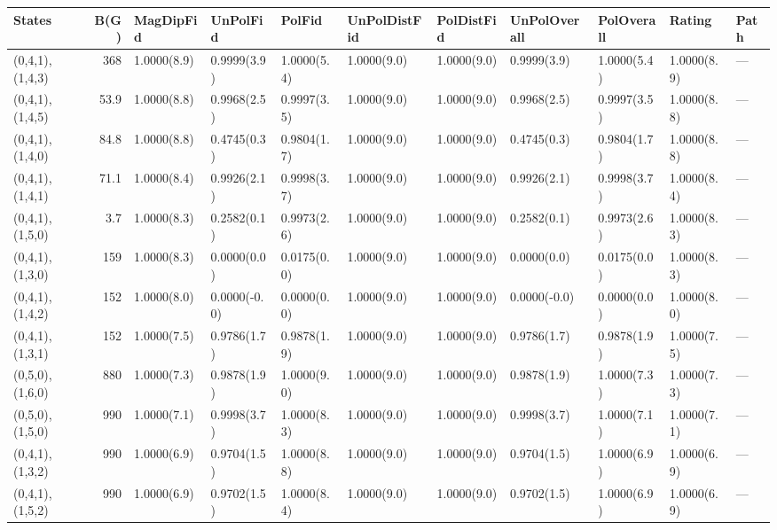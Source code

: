 \begin{tabular}{lrlllllllll}
\hline
 States          &   B(G) & MagDipFid   & UnPolFid     & PolFid       & UnPolDistFid   & PolDistFid   & UnPolOverall   & PolOverall   & Rating      & Path   \\
\hline
 (0,4,1),(1,4,3) &  368   & 1.0000(8.9) & 0.9999(3.9)  & 1.0000(5.4)  & 1.0000(9.0)    & 1.0000(9.0)  & 0.9999(3.9)    & 1.0000(5.4)  & 1.0000(8.9) & ---    \\
 (0,4,1),(1,4,5) &   53.9 & 1.0000(8.8) & 0.9968(2.5)  & 0.9997(3.5)  & 1.0000(9.0)    & 1.0000(9.0)  & 0.9968(2.5)    & 0.9997(3.5)  & 1.0000(8.8) & ---    \\
 (0,4,1),(1,4,0) &   84.8 & 1.0000(8.8) & 0.4745(0.3)  & 0.9804(1.7)  & 1.0000(9.0)    & 1.0000(9.0)  & 0.4745(0.3)    & 0.9804(1.7)  & 1.0000(8.8) & ---    \\
 (0,4,1),(1,4,1) &   71.1 & 1.0000(8.4) & 0.9926(2.1)  & 0.9998(3.7)  & 1.0000(9.0)    & 1.0000(9.0)  & 0.9926(2.1)    & 0.9998(3.7)  & 1.0000(8.4) & ---    \\
 (0,4,1),(1,5,0) &    3.7 & 1.0000(8.3) & 0.2582(0.1)  & 0.9973(2.6)  & 1.0000(9.0)    & 1.0000(9.0)  & 0.2582(0.1)    & 0.9973(2.6)  & 1.0000(8.3) & ---    \\
 (0,4,1),(1,3,0) &  159   & 1.0000(8.3) & 0.0000(0.0)  & 0.0175(0.0)  & 1.0000(9.0)    & 1.0000(9.0)  & 0.0000(0.0)    & 0.0175(0.0)  & 1.0000(8.3) & ---    \\
 (0,4,1),(1,4,2) &  152   & 1.0000(8.0) & 0.0000(-0.0) & 0.0000(0.0)  & 1.0000(9.0)    & 1.0000(9.0)  & 0.0000(-0.0)   & 0.0000(0.0)  & 1.0000(8.0) & ---    \\
 (0,4,1),(1,3,1) &  152   & 1.0000(7.5) & 0.9786(1.7)  & 0.9878(1.9)  & 1.0000(9.0)    & 1.0000(9.0)  & 0.9786(1.7)    & 0.9878(1.9)  & 1.0000(7.5) & ---    \\
 (0,5,0),(1,6,0) &  880   & 1.0000(7.3) & 0.9878(1.9)  & 1.0000(9.0)  & 1.0000(9.0)    & 1.0000(9.0)  & 0.9878(1.9)    & 1.0000(7.3)  & 1.0000(7.3) & ---    \\
 (0,5,0),(1,5,0) &  990   & 1.0000(7.1) & 0.9998(3.7)  & 1.0000(8.3)  & 1.0000(9.0)    & 1.0000(9.0)  & 0.9998(3.7)    & 1.0000(7.1)  & 1.0000(7.1) & ---    \\
 (0,4,1),(1,3,2) &  990   & 1.0000(6.9) & 0.9704(1.5)  & 1.0000(8.8)  & 1.0000(9.0)    & 1.0000(9.0)  & 0.9704(1.5)    & 1.0000(6.9)  & 1.0000(6.9) & ---    \\
 (0,4,1),(1,5,2) &  990   & 1.0000(6.9) & 0.9702(1.5)  & 1.0000(8.4)  & 1.0000(9.0)    & 1.0000(9.0)  & 0.9702(1.5)    & 1.0000(6.9)  & 1.0000(6.9) & ---    \\

\end{tabular}
